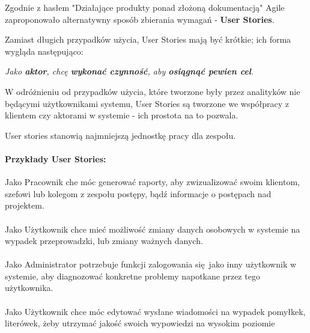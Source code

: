 \documentclass{article}
\begin{document}
Zgodnie z hasłem "Działające produkty ponad złożoną dokumentacją" Agile zaproponowało alternatywny sposób zbierania wymagań - \textbf{User Stories}.

Zamiast długich przypadków użycia, User Stories mają być krótkie; ich forma wygląda następująco:

\begin{center}
    \textit{Jako \textbf{aktor}, chcę \textbf{wykonać czynność}, aby \textbf{osiągnąć pewien cel}.}
\end{center}

W odróżnieniu od przypadków użycia, które tworzone były przez analityków nie będącymi użytkownikami systemu, User Stories są tworzone we współpracy z klientem czy aktorami w systemie - ich prostota na to pozwala.

User stories stanowią najmniejszą jednostkę pracy dla zespołu.

\paragraph{Przykłady User Stories:}

\begin{center}
    Jako Pracownik che móc generować raporty, aby zwizualizować swoim klientom, szefowi lub kolegom z zespołu postępy, bądź informacje o postępach nad projektem.

    \paragraph{}
    Jako Użytkownik chce mieć możliwość zmiany danych osobowych w systemie na wypadek przeprowadzki, lub zmiany ważnych danych.

    \paragraph{}
    Jako Administrator potrzebuje funkcji zalogowania się jako inny użytkownik w systemie, aby diagnozować konkretne problemy napotkane przez tego użytkownika.

    \paragraph{}
    Jako Użytkownik chce móc edytować wysłane wiadomości na wypadek pomyłkek, literówek, żeby utrzymać jakość swoich wypowiedzi na wysokim poziomie

\end{center}
\end{document}
